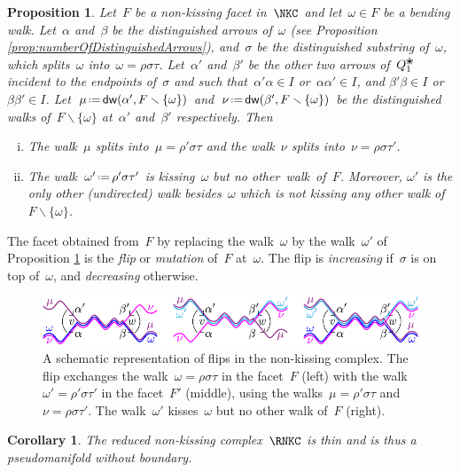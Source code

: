 \documentclass{amsart}
\newtheorem{corollary}[theorem]{Corollary}
\newtheorem{proposition}[theorem]{Proposition}
\theoremstyle{definition}
\newcommand{\ssm}{\smallsetminus} %
\newcommand{\eqdef}{\mbox{\,\raisebox{0.2ex}{\scriptsize\ensuremath{\mathrm:}}\ensuremath{=}\,}} %
\newcommand{\darkblue}{\color{darkblue}} %
\newcommand{\defn}[1]{\textsl{\darkblue #1}} %
\newcommand{\blossom}{^\text{\ding{96}}} %
\newcommand{\distinguishedWalk}[2]{\mathsf{dw}(#1,#2)} %
\begin{document}
\begin{proposition}
\label{prop:flip}
Let~$F$ be a non-kissing facet in~$\NKC$ and let~$\omega \in F$ be a bending walk.
Let~$\alpha$ and~$\beta$ be the distinguished arrows of~$\omega$ (see Proposition \ref{prop:numberOfDistinguishedArrows}), and~$\sigma$ be the distinguished substring of~$\omega$, which splits~$\omega$ into~$\omega = \rho \sigma \tau$.
Let~$\alpha'$ and~$\beta'$ be the other two arrows of~$Q_1\blossom$ incident to the endpoints of~$\sigma$ and such that~$\alpha'\alpha \in I$ or~$\alpha\alpha' \in I$, and $\beta'\beta \in I$ or~$\beta\beta' \in I$.
Let~$\mu \eqdef \distinguishedWalk{\alpha'}{F \ssm \{\omega\}}$ and~$\nu \eqdef \distinguishedWalk{\beta'}{F \ssm \{\omega\}}$ be the distinguished walks of~$F \ssm \{\omega\}$ at~$\alpha'$ and~$\beta'$ respectively.
Then
\begin{enumerate}[(i)]
\item The walk~$\mu$ splits into~$\mu = \rho' \sigma \tau$ and the walk~$\nu$ splits into~$\nu = \rho \sigma \tau'$.
\item The walk~$\omega' \eqdef \rho' \sigma \tau'$ is kissing~$\omega$ but no other~walk~of~$F$. Moreover, $\omega'$ is the only other (undirected) walk besides~$\omega$ which is not kissing any other walk of~$F \ssm \{\omega\}$.
\end{enumerate}
\end{proposition}
The facet obtained from~$F$ by replacing the walk~$\omega$ by the walk~$\omega'$ of Proposition \ref{prop:flip} is the \defn{flip} or \defn{mutation} of~$F$ at~$\omega$.
The flip is \defn{increasing} if~$\sigma$ is on top of~$\omega$, and \defn{decreasing} otherwise.

\begin{figure}[t]
	\capstart
	\centerline{\includegraphics[scale=1]{flip1}}
	\caption{A schematic representation of flips in the non-kissing complex. The flip exchanges the walk~$\omega = \rho \sigma \tau$ in the facet~$F$ (left) with the walk~$\omega' = \rho' \sigma \tau'$ in the facet~$F'$ (middle), using the walks~$\mu = \rho' \sigma \tau$ and~$\nu = \rho \sigma \tau'$. The walk~$\omega'$ kisses~$\omega$ but no other walk of~$F$ (right).}
	\label{fig:flip1}
\end{figure}

\begin{corollary}
\label{coro:thin}
The reduced non-kissing complex~$\RNKC$ is thin and is thus a pseudomanifold without boundary.
\end{corollary}
\end{document}
